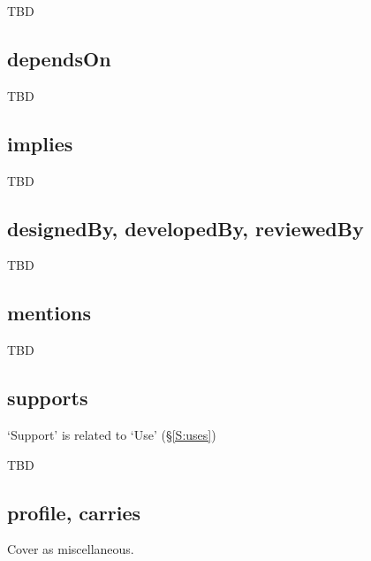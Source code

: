 TBD

\begin{comment}
Contributions based on other contributions
Contributions varying other contributions
\end{comment}


\subsection{dependsOn}

TBD


\subsection{implies}

TBD


\subsection{designedBy, developedBy, reviewedBy}

TBD


\subsection{mentions}



TBD


\subsection{supports}

`Support' is related to `Use' (\S\ref{S:uses})



TBD

\begin{comment}
Haskell supports Functional programming
Rails supports DRY (uses? DRY)
JAXB supports XML-data binding and Object/XML mapping
... ?
\end{comment}


\subsection{profile, carries}

Cover as miscellaneous.

